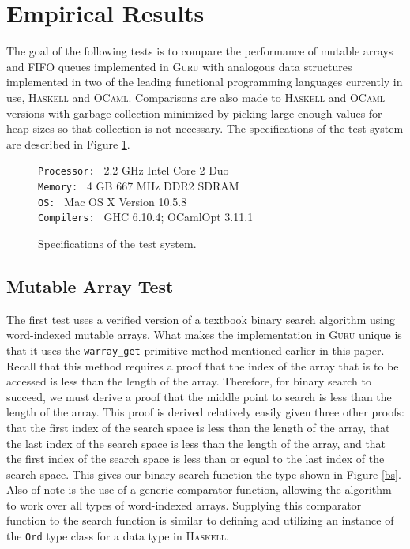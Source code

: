 \documentclass[9pt,natbib]{sigplanconf}
\begin{document}
\section{Empirical Results}
\label{sec:emp}

The goal of the following tests is to compare the performance of
mutable arrays and FIFO queues implemented in \textsc{Guru} with
analogous data structures implemented in two of the leading functional
programming languages currently in use, \textsc{Haskell} and
\textsc{OCaml}.  Comparisons are also made to \textsc{Haskell} and
\textsc{OCaml} versions with garbage collection minimized by picking
large enough values for heap sizes so that collection is not
necessary.  The specifications of the test system are described in
Figure \ref{teststats}.


\begin{figure}
\texttt{Processor: } 2.2 GHz Intel Core 2 Duo \\
\texttt{Memory: } 4 GB 667 MHz DDR2 SDRAM \\
\texttt{OS: } Mac OS X Version 10.5.8 \\
\texttt{Compilers: } GHC 6.10.4; OCamlOpt 3.11.1 
\caption{Specifications of the test system.}
\label{teststats}
\end{figure}

\subsection{Mutable Array Test}

The first test uses a verified version of a textbook binary search
algorithm using word-indexed mutable arrays.  What makes the
implementation in \textsc{Guru} unique is that it uses the
\texttt{warray\_get} primitive method mentioned earlier in this paper.
Recall that this method requires a proof that the index of the array
that is to be accessed is less than the length of the array.
Therefore, for binary search to succeed, we must derive a proof that
the middle point to search is less than the length of the array.  This
proof is derived relatively easily given three other proofs: that the
first index of the search space is less than the length of the array,
that the last index of the search space is less than the length of the
array, and that the first index of the search space is less than or
equal to the last index of the search space.  This gives our binary
search function the type shown in Figure \ref{bs}.  Also of note is
the use of a generic comparator function, allowing the algorithm to
work over all types of word-indexed arrays.  Supplying this comparator
function to the search function is similar to defining and utilizing
an instance of the \texttt{Ord} type class for a data type in
\textsc{Haskell}.
\end{document}
